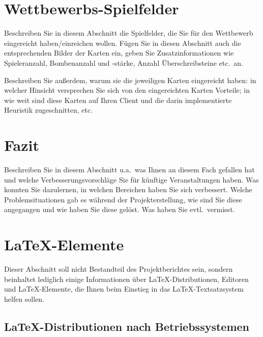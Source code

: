 \documentclass[12pt,a4paper,bibliography=totocnumbered,listof=totocnumbered]{scrartcl}
\begin{document}
\newpage
\section{Wettbewerbs-Spielfelder}
Beschreiben Sie in diesem Abschnitt die Spielfelder, die Sie für den Wettbewerb eingereicht haben/einreichen wollen. Fügen Sie in diesen Abschnitt auch die entsprechenden Bilder der Karten ein, geben Sie Zusatzinformationen wie Spieleranzahl, Bombenanzahl und -stärke, Anzahl Überschreibsteine etc.\ an.

Beschreiben Sie außerdem, warum sie die jeweiligen Karten eingereicht haben: in welcher Hinsicht versprechen Sie sich von den eingereichten Karten Vorteile; in wie weit sind diese Karten auf Ihren Client und die darin implementierte Heuristik zugeschnitten, etc.


\newpage
\section{Fazit}
Beschreiben Sie in diesem Abschnitt u.a.\ was Ihnen an diesem Fach gefallen hat und welche Verbesserungsvorschläge Sie für künftige Veranstaltungen haben. Was konnten Sie dazulernen, in welchen Bereichen haben Sie sich verbessert. Welche Problemsituationen gab es während der Projekterstellung, wie sind Sie diese angegangen und wie haben Sie diese gelöst. Was haben Sie evtl.\ vermisst.


\newpage
\section{\LaTeX-Elemente}
Dieser Abschnitt soll nicht Bestandteil des Projektberichtes sein, sondern beinhaltet lediglich einige Informationen über \LaTeX-Distributionen, Editoren und \LaTeX-Elemente, die Ihnen beim Einstieg in das \LaTeX-Textsatzsystem helfen sollen.

\subsection{\LaTeX-Distributionen nach Betriebssystemen}
\end{document}
